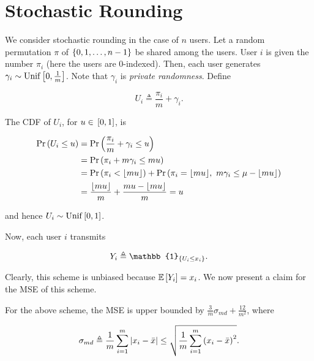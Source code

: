 \documentclass[twoside]{article}
\begin{document}



\section{Stochastic Rounding}

We consider stochastic rounding in the case of \(n\) users. Let a random 
permutation \(\pi\) of \(\left\{0,1,\ldots,n-1\right\}\) be shared among the users.
User \(i\) is given the number \(\pi_i\) (here the users are 0-indexed). Then,
each user generates \(\gamma_i \sim \mathrm{Unif}{}\left[0,\frac{1}{m}\right]\).
Note that \(\gamma_i\) is \emph{private randomness}. Define

\begin{equation}
    U_i \triangleq \frac{\pi_i}{m} + \gamma_i.
    \label{eq:Ui-def}
\end{equation}

The CDF of \(U_i\), for \(u \in {}\left[0,1\right]\), is

\begin{align}
    \Pr\left(U_i\le u\right) &= \Pr\left(\frac{\pi_i}{m}+ \gamma_i \le u\right) \\
                  &= \Pr\left(\pi_i + m\gamma_i \le mu\right) \\
                  &= \Pr\left(\pi_i < \lfloor mu\rfloor\right) + \Pr\left(\pi_i = \lfloor mu\rfloor,\ m\gamma_i \le \mu - \lfloor mu\rfloor\right) \\
                  &= \frac{\lfloor mu\rfloor}{m} + \frac{mu-\lfloor mu\rfloor}{m} = u
                  \label{eq:ui-cdf}
\end{align}

and hence \(U_i \sim \mathrm{Unif}{}\left[0,1\right]\).

Now, each user \(i\) transmits

\begin{equation}
    Y_i \triangleq \mathbb{1}_{\cbrak{U_i\le x_i}}.
    \label{eq:Yi-def}
\end{equation}

Clearly, this scheme is unbiased because \(\mathbb{E}\left[ Y_i \right] = x_i\). We now present
a claim for the MSE of this scheme.

\begin{claim}
    For the above scheme, the MSE is upper bounded by \(\frac{3}{m}\sigma_{md} + \frac{12}{m^2}\), where

    \begin{equation}
        \sigma_{md} \triangleq \frac{1}{m}\sum_{i=1}^m\left\vert x_i-\bar{x}\right\vert \le \sqrt{\frac{1}{m}\sum_{i=1}^m\left(x_i-\bar{x}\right)^2}.
        \label{eq:sigma-md-def}
    \end{equation}
\end{claim}
\end{document}
